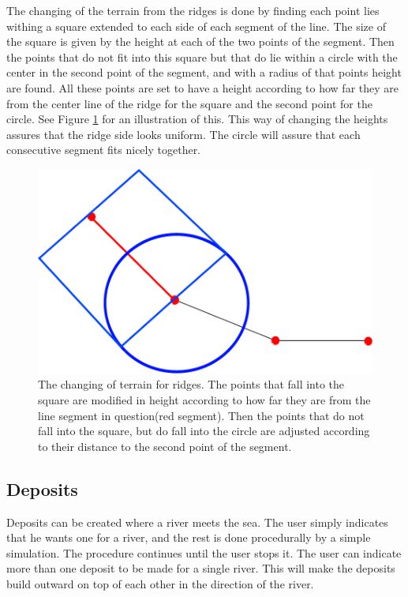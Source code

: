 \documentclass[a4paper,12pt]{report}
\begin{document}
The changing of the terrain from the ridges is done by finding each point lies withing a square extended to each side of each segment of the line. The size of the square is given by the height at each of the two points of the segment. Then the points that do not fit into this square but that do lie within a circle with the center in the second point of the segment, and with a radius of that points height are found. All these points are set to have a height according to how far they are from the center line of the ridge for the square and the second point for the circle. See Figure \ref{fig:ridgeTerrain} for an illustration of this. This way of changing the heights assures that the ridge side looks uniform. The circle will assure that each consecutive segment fits nicely together.

\begin{figure}
\centering
\includegraphics[width=.7\linewidth]{thesis/ridgeTerrain.pdf}
 \caption{The changing of terrain for ridges. The points that fall into the square are modified in height according to how far they are from the line segment in question(red segment). Then the points that do not fall into the square, but do fall into the circle are adjusted according to their distance to the second point of the segment.}
 \label{fig:ridgeTerrain}
\end{figure}

\subsection{Deposits}
Deposits can be created where a river meets the sea. The user simply indicates that he wants one for a river, and the rest is done procedurally by a simple simulation. The procedure continues until the user stops it. The user can indicate more than one deposit to be made for a single river. This will make the deposits build outward on top of each other in the direction of the river.
\end{document}
